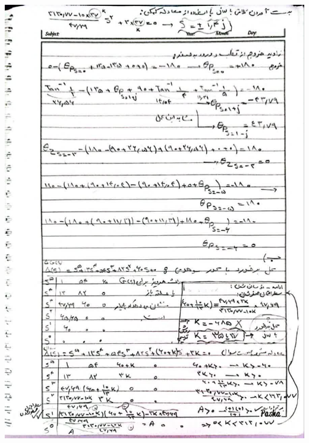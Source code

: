 \documentclass[a4,12pt]{article}
\begin{document}
			\includegraphics[width=15cm]{q3p.jpg}
\end{document}
